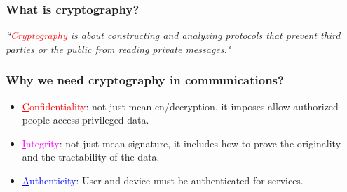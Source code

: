 \documentclass[aspectratio=169,xcolor=dvipsnames]{beamer}
\begin{document}
\frame
{
  \frametitle{What is cryptography?}

    \textit{``\textcolor{red}{Cryptography} is about constructing and analyzing protocols that prevent third parties or the public from reading private messages." \scriptsize{}}

    \begin{center}
    \end{center}

}

\frame
{
 \frametitle{Why we need cryptography in communications?}

 \begin{itemize}
 \setlength{\itemsep}{12pt}
 \item \textcolor{red}{\underline{C}onfidentiality}: not just mean en/decryption, it imposes allow authorized people access privileged data.
 \item \textcolor{magenta}{\underline{I}ntegrity}: not just mean signature, it includes how to prove the originality and the tractability of the data.
 \item \textcolor{blue}{\underline{A}uthenticity}: User and device must be authenticated for services.
 \end{itemize}
}
\end{document}
